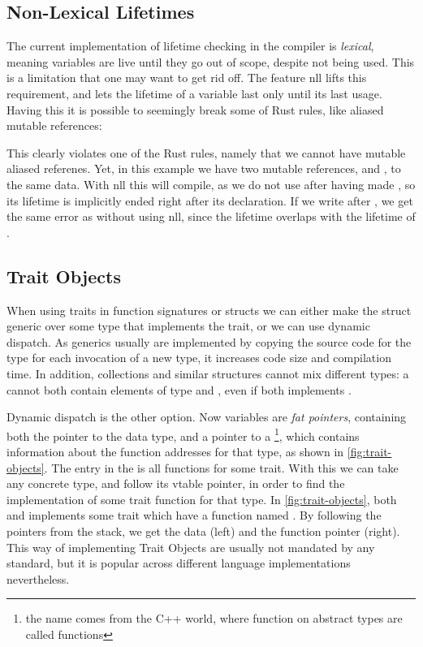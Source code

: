 \subsection{Non-Lexical Lifetimes\label{sec:nll}}
The current implementation of lifetime checking in the compiler is \emph{lexical}, meaning
variables are live until they go out of scope, despite not being used. This is a limitation that
one may want to get rid off. The feature \gls{nll} lifts this requirement, and lets the lifetime of
a variable last only until its last usage. Having this it is possible to seemingly break some of
Rust rules, like aliased mutable references:

This clearly violates one of the Rust rules, namely that we cannot have mutable aliased referenes.
Yet, in this example we have two mutable references,  and , to the same data.
With \gls{nll} this will compile, as we do not use  after having made , so its
lifetime is implicitly ended right after its declaration. If we write  after
, we get the same error as without using \gls{nll}, since the lifetime 
overlaps with the lifetime of .



\subsection{Trait Objects\label{sec:trait-objects}}

When using traits in function signatures or structs we can either make the struct generic over some
type that implements the trait, or we can use dynamic dispatch. As generics usually are implemented
by copying the source code for the type for each invocation of a new type, it increases code size
and compilation time. In addition, collections and similar structures cannot mix different types: a
 cannot both contain elements of type  and , even if both
implements .

Dynamic dispatch is the other option. Now variables are \emph{fat pointers}, containing both the
pointer to the data type, and a pointer to a \footnote{the name  comes
from the C++ world, where function on abstract types are called  functions}, which
contains information about the function addresses for that type, as shown in
\cref{fig:trait-objects}. The entry in the  is all functions for some trait. With this
we can take any concrete type, and follow its vtable pointer, in order to find the implementation
of some trait function for that type. In \cref{fig:trait-objects}, both  and 
implements some trait which have a function named . By following the pointers from the
stack, we get the data (left) and the function pointer (right). This way of implementing Trait
Objects are usually not mandated by any standard, but it is popular across different language
implementations nevertheless.

